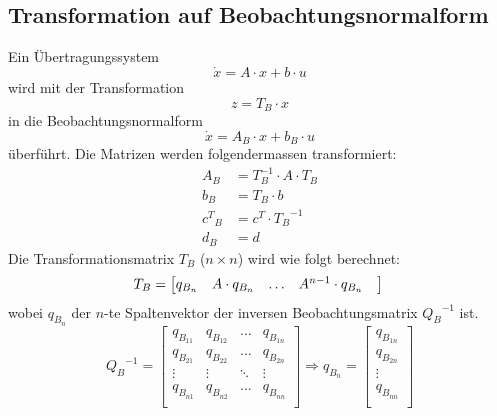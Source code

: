 \subsection{Transformation auf Beobachtungsnormalform}
Ein Übertragungssystem 
\[ \dot{x}=A\cdot x +  b \cdot u \]
wird mit der Transformation  
\[ z=T_B\cdot x \]
in die Beobachtungsnormalform
\[ \dot{x}=A_B\cdot x +  b_B \cdot u \]
überführt. Die Matrizen werden folgendermassen transformiert:
\[\begin{aligned}
	A_B &= T_B^{-1}\cdot A \cdot {T_B}	\\	
	b_B &= T_B\cdot b	\\	
	{c^T}_B &= c^T\cdot {T_B}^{-1}	\\	
	d_B &= d
\end{aligned}\]
Die Transformationsmatrix $T_B$ ($n\times n$) wird wie folgt berechnet:
\[
	T_B=
	\begin{bmatrix}
		q_{B_n} & A\cdot q_{B_n} &  \ldots & A^{n-1}\cdot q_{B_n} & \\
	\end{bmatrix}	\\
\]
wobei $q_{B_n}$ der $n$-te Spaltenvektor der inversen Beobachtungsmatrix ${Q_B}^{-1}$ ist.
\[
	{Q_B}^{-1} = \begin{bmatrix}
	 q_{B_{11}} & q_{B_{12}} & \ldots & q_{B_{1n}}\\
	 q_{B_{21}} & q_{B_{22}} & \ldots & q_{B_{2n}}\\
	 \vdots		& \vdots	 & \ddots & \vdots\\
	 q_{B_{n1}} & q_{B_{n2}} & \ldots & q_{B_{nn}}\\	 
	\end{bmatrix} \Rightarrow
	q_{B_n}=
	\begin{bmatrix}
		q_{B_{1n}} \\
		q_{B_{2n}} \\
		\vdots \\
		q_{B_{nn}} \\
	\end{bmatrix}	
\]



